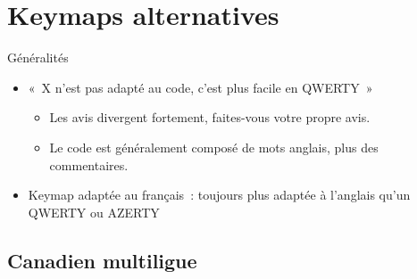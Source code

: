 \section{Keymaps alternatives}


\begin{frame}{Généralités}
    \begin{itemize}
        \item «~X n’est pas adapté au code, c’est plus facile en QWERTY~» \pause
            \begin{itemize}
                \item Les avis divergent fortement, faites-vous votre propre
                  avis. \pause

                \item Le code est généralement composé de mots anglais, plus
                  des commentaires.
            \end{itemize}
            \pause

        \item Keymap adaptée au français~: toujours plus adaptée à
          l’anglais qu’un QWERTY ou AZERTY
    \end{itemize}
\end{frame}



\subsection{Canadien multiligue}


